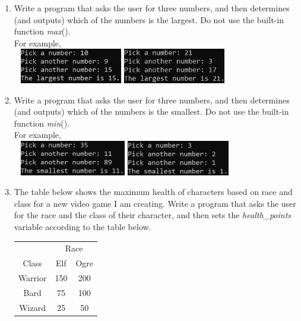\documentclass{article}
\begin{document}
\begin{enumerate}
	\item
		Write a program that asks the user for three numbers, and then determines (and outputs) which of the 
		numbers is the largest.  Do not use the built-in function \textit{max}().\\
		For example, \\ \ \hfill
		\includegraphics[height = 0.6in]{./imgs/largest_ex1.PNG} \hfill
		\includegraphics[height = 0.6in]{./imgs/largest_ex2.PNG} \hfill \ 



	\item
		Write a program that asks the user for three numbers, and then determines (and outputs) which of the 
		numbers is the smallest.  Do not use the built-in function \textit{min}().\\
		For example, \\ \ \hfill
		\includegraphics[height = 0.6in]{./imgs/smallest_ex1.PNG} \hfill
		\includegraphics[height = 0.6in]{./imgs/smallest_ex2.PNG} \hfill \ 




	\item		
		The table below shows the maximum health of characters based on race and class for a new video game 
		I am creating.  Write a program that asks the user for the race and the class of their character, 
		and then sets the \textit{health\_points}	variable according to the table below.
		\begin{flushright}
		\begin{tabular}{c|cc}
			& \multicolumn{2}{c}{Race}\\
			Class & Elf & Ogre \\ \hline
			Warrior & 150 & 200\\
			Bard & 75 & 100\\
			Wizard & 25 & 50 \\
		\end{tabular}
		\end{flushright}
		

\end{enumerate}
\end{document}
